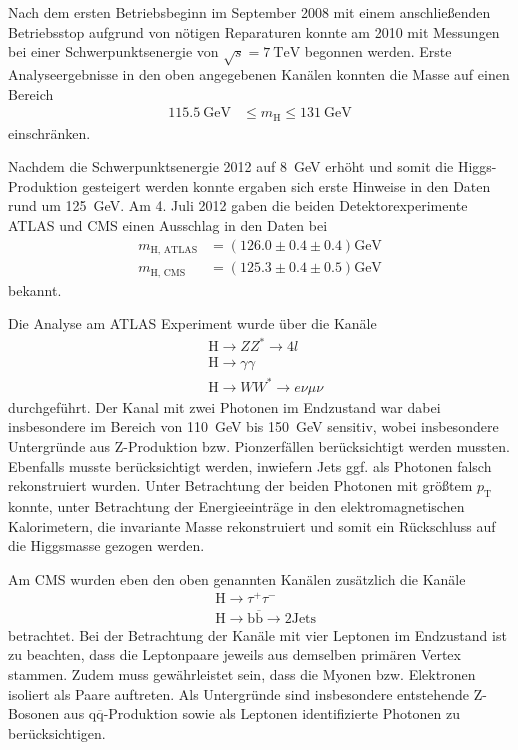 Nach dem ersten Betriebsbeginn im September 2008 mit einem anschließenden Betriebsstop aufgrund von nötigen Reparaturen konnte am 2010 mit Messungen bei einer Schwerpunktsenergie von $\sqrt{s} = \SI{7}{\tera\electronvolt}$ begonnen werden.
Erste Analyseergebnisse in den oben angegebenen Kanälen konnten die Masse auf einen Bereich 
\begin{align*}
	\SI{115.5}{\giga\electronvolt} &\leq m_\text{H} \leq \SI{131}{\giga\electronvolt}
\end{align*}
einschränken.

Nachdem die Schwerpunktsenergie 2012 auf \SI{8}{\giga\electronvolt} erhöht und somit die Higgs-Produktion gesteigert werden konnte ergaben sich erste Hinweise in den Daten rund um \SI{125}{\giga\electronvolt}.
Am 4. Juli 2012 gaben die beiden Detektorexperimente ATLAS und CMS einen Ausschlag in den Daten bei
\begin{align*}
  m_{\text{H, ATLAS}} &= \left( \num{126.0} \pm \num{0.4} \pm \num{0.4} \right) \si{\giga\electronvolt} \\
  m_{\text{H, CMS}} &= \left( \num{125.3} \pm \num{0.4} \pm \num{0.5} \right) \si{\giga\electronvolt}
\end{align*}
bekannt.

Die Analyse am ATLAS Experiment wurde über die Kanäle
\begin{align*}
  &\text{H} \rightarrow Z Z^* \rightarrow 4l \\
  &\text{H} \rightarrow \gamma \gamma \\
  &\text{H} \rightarrow W W^* \rightarrow e \nu \mu \nu
\end{align*}
durchgeführt.
Der Kanal mit zwei Photonen im Endzustand war dabei insbesondere im Bereich von \SI{110}{\giga\electronvolt} bis \SI{150}{\giga\electronvolt} sensitiv, wobei insbesondere Untergründe aus Z-Produktion bzw. Pionzerfällen berücksichtigt werden mussten.
Ebenfalls musste berücksichtigt werden, inwiefern Jets ggf. als Photonen falsch rekonstruiert wurden.
Unter Betrachtung der beiden Photonen mit größtem $p_\text{T}$ konnte, unter Betrachtung der Energieeinträge in den elektromagnetischen Kalorimetern, die invariante Masse rekonstruiert und somit ein Rückschluss auf die Higgsmasse gezogen werden.

Am CMS wurden eben den oben genannten Kanälen zusätzlich die Kanäle 
\begin{align*}
  &\text{H} \rightarrow \tau^+ \tau^- \\
  &\text{H} \rightarrow \text{b} \overline{\text{b}} \rightarrow 2 \text{Jets}
\end{align*}
betrachtet.
Bei der Betrachtung der Kanäle mit vier Leptonen im Endzustand ist zu beachten, dass die Leptonpaare jeweils aus demselben primären Vertex stammen.
Zudem muss gewährleistet sein, dass die Myonen bzw. Elektronen isoliert als Paare auftreten.
Als Untergründe sind insbesondere entstehende Z-Bosonen aus $\text{q}\overline{\text{q}}$-Produktion sowie als Leptonen identifizierte Photonen zu berücksichtigen.

